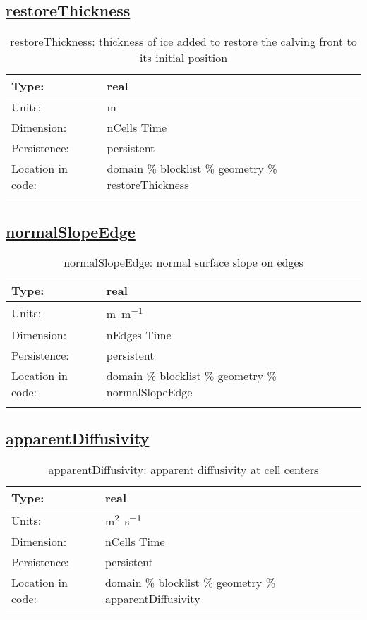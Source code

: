 \subsection[restoreThickness]{\hyperref[sec:var_tab_geometry]{restoreThickness}}
\label{subsec:var_sec_geometry_restoreThickness}
\begin{center}
\begin{longtable}{| p{2.0in} | p{4.0in} |}
        \hline 
        Type: & real \\
        \hline 
        Units: & \si{m} \\
        \hline 
        Dimension: & nCells Time \\
        \hline 
        Persistence: & persistent \\
        \hline 
         Location in code: & domain \% blocklist \% geometry \% restoreThickness \\
         \hline 
    \caption{restoreThickness: thickness of ice added to restore the calving front to its initial position}
\end{longtable}
\end{center}
\subsection[normalSlopeEdge]{\hyperref[sec:var_tab_geometry]{normalSlopeEdge}}
\label{subsec:var_sec_geometry_normalSlopeEdge}
\begin{center}
\begin{longtable}{| p{2.0in} | p{4.0in} |}
        \hline 
        Type: & real \\
        \hline 
        Units: & \si{m.m^{-1}} \\
        \hline 
        Dimension: & nEdges Time \\
        \hline 
        Persistence: & persistent \\
        \hline 
         Location in code: & domain \% blocklist \% geometry \% normalSlopeEdge \\
         \hline 
    \caption{normalSlopeEdge: normal surface slope on edges}
\end{longtable}
\end{center}
\subsection[apparentDiffusivity]{\hyperref[sec:var_tab_geometry]{apparentDiffusivity}}
\label{subsec:var_sec_geometry_apparentDiffusivity}
\begin{center}
\begin{longtable}{| p{2.0in} | p{4.0in} |}
        \hline 
        Type: & real \\
        \hline 
        Units: & \si{m^2.s^{-1}} \\
        \hline 
        Dimension: & nCells Time \\
        \hline 
        Persistence: & persistent \\
        \hline 
         Location in code: & domain \% blocklist \% geometry \% apparentDiffusivity \\
         \hline 
    \caption{apparentDiffusivity: apparent diffusivity at cell centers}
\end{longtable}
\end{center}
